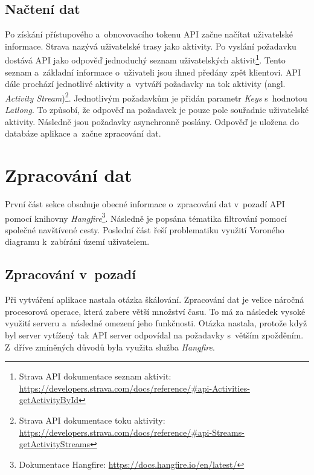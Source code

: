 \subsection{Načtení dat}
\label{getData}
Po získání přístupového a~obnovovacího tokenu API začne načítat uživatelské informace.
Strava nazývá uživatelské trasy jako aktivity. Po vyslání požadavku dostává API jako odpověď jednoduchý seznam uživatelských aktivit\footnote{Strava API dokumentace seznam aktivit: \url{https://developers.strava.com/docs/reference/\#api-Activities-getActivityById}}. Tento seznam a~základní informace o~uživateli jsou ihned předány zpět klientovi. API dále prochází jednotlivé aktivity a~vytváří požadavky na tok aktivity (angl. \emph{Activity Stream})\footnote{Strava API dokumentace toku aktivity:  \url{https://developers.strava.com/docs/reference/\#api-Streams-getActivityStreams}}. Jednotlivým požadavkům je přidán parametr \emph{Keys} s~hodnotou \emph{Latlong}. To způsobí, že odpověď na požadavek je pouze pole souřadnic uživatelské aktivity. Následně jsou požadavky asynchronně poslány. Odpověď je uložena do databáze aplikace a~začne zpracování dat.

\section{Zpracování dat}
\label{transformData}
První část sekce obsahuje obecné informace o~zpracování dat v~pozadí API pomocí knihovny \emph{Hangfire}\footnote{Dokumentace Hangfire: \url{https://docs.hangfire.io/en/latest/}}. Následně je popsána tématika filtrování pomocí společné navštívené cesty. Poslední část řeší problematiku využití Voroného diagramu k~zabírání území uživatelem. 
\subsection{Zpracování v~pozadí}
Při vytváření aplikace nastala otázka škálování. Zpracování dat je velice náročná procesorová operace, která zabere větší množství času. To má za následek vysoké využití serveru a~následné omezení jeho funkčnosti. Otázka nastala, protože když byl server vytížený tak API server odpovídal na požadavky s~větším zpožděním. Z~dříve zmíněných důvodů byla využita služba \emph{Hangfire}.
